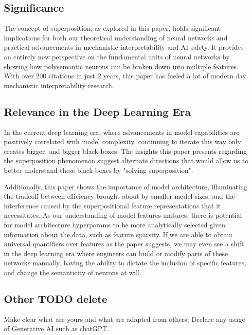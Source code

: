 
\subsection{Significance}

The concept of superposition, as explored in this paper, holds significant implications for both our theoretical understanding of neural networks and practical advancements in mechanistic interpretability and AI safety.
It provides an entirely new perspective on the fundamental units of neural networks by showing how polysemantic neurons can be broken down into multiple features.
With over 200 citations in just 2 years, this paper has fueled a lot of modern day mechanistic interpretability research.

\subsection{Relevance in the Deep Learning Era}

In the current deep learning era, where advancements in model capabilities are positively correlated with model complexity, continuing to iterate this way only creates bigger, and bigger black boxes.
The insights this paper presents regarding the superposition phenomenon suggest alternate directions that would allow us to better understand these black boxes by "solving superposition".

Additionally, this paper shows the importance of model architecture, illuminating the tradeoff between efficiency brought about by smaller model sizes, and the interference caused by the superpositional feature representations that it necessitates.
As our understanding of model features matures, there is potential for model architecture hyperparams to be more analytically selected given information about the data, such as feature sparsity.
If we are able to obtain universal quantifiers over features as the paper suggests, we may even see a shift in the deep learning era where engineers can build or modify parts of these networks manually, having the ability to dictate the inclusion of specific features, and change the semanticity of neurons at will.

\subsection{Other TODO delete}

Make clear what are yours and what are adapted from others;
Declare any usage of Generative AI such as chatGPT.
